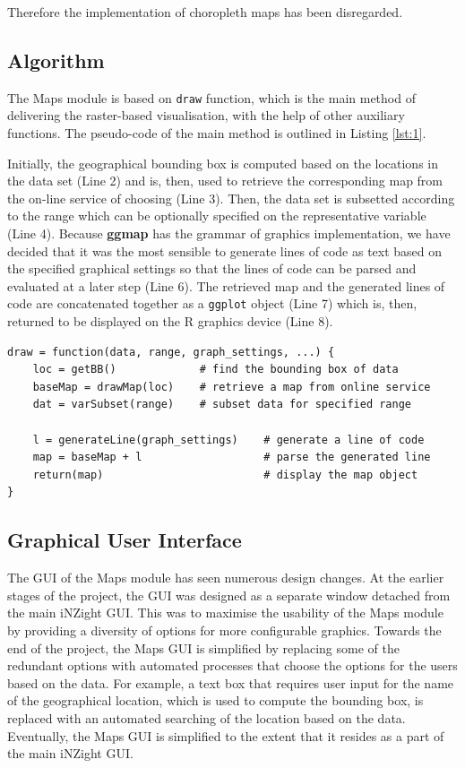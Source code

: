 \documentclass[a4paper, 12pt]{article}
\begin{document}
Therefore the implementation of choropleth maps has been disregarded.

\subsection{Algorithm}
\label{subsec:2.3}
The Maps module is based on \texttt{draw} function, which is the main method of delivering the raster-based visualisation, with the help of other auxiliary functions. The pseudo-code of the main method is outlined in Listing \ref{lst:1}.

Initially, the geographical bounding box is computed based on the locations in the data set (Line 2) and is, then, used to retrieve the corresponding map from the on-line service of choosing (Line 3). Then, the data set is subsetted according to the range which can be optionally specified on the representative variable (Line 4). Because \textbf{ggmap} has the grammar of graphics implementation, we have decided that it was the most sensible to generate lines of code as text based on the specified graphical settings so that the lines of code can be parsed and evaluated at a later step (Line 6). The retrieved map and the generated lines of code are concatenated together as a \texttt{ggplot} object (Line 7) which is, then, returned to be displayed on the R graphics device (Line 8).

\begin{lstlisting}[caption={\texttt{draw} pseudo-code}, label={lst:1}]
draw = function(data, range, graph_settings, ...) {
	loc = getBB()             # find the bounding box of data
	baseMap = drawMap(loc)    # retrieve a map from online service
	dat = varSubset(range)    # subset data for specified range
	
	l = generateLine(graph_settings)    # generate a line of code
	map = baseMap + l                   # parse the generated line
	return(map)                         # display the map object
}
\end{lstlisting}

\subsection{Graphical User Interface}
\label{subsec:2.4}
The GUI of the Maps module has seen numerous design changes. At the earlier stages of the project, the GUI was designed as a separate window detached from the main iNZight GUI. This was to maximise the usability of the Maps module by providing a diversity of options for more configurable graphics. Towards the end of the project, the Maps GUI is simplified by replacing some of the redundant options with automated processes that choose the options for the users based on the data. For example, a text box that requires user input for the name of the geographical location, which is used to compute the bounding box, is replaced with an automated searching of the location based on the data. Eventually, the Maps GUI is simplified to the extent that it resides as a part of the main iNZight GUI.
\end{document}
